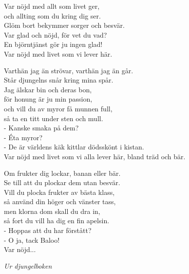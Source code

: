 \vspace{10pt}
Var nöjd med allt som livet ger,\\
och allting som du kring dig ser.\\
Glöm bort bekymmer sorger och besvär.\\
Var glad och nöjd, för vet du vad?\\
En björntjänst gör ju ingen glad!\\
Var nöjd med livet som vi lever här.\par
\vspace{10pt}
Varthän jag än strövar, varthän jag än går.\\
Står djungelns snår kring mina spår.\\
Jag älskar bin och deras bon,\\
för honung är ju min passion,\\
och vill du av myror få munnen full,\\
så ta en titt under sten och mull.\\
- Kanske smaka på dem?\\
- Éta myror?\\
- De är världens käk kittlar dödsskönt i kistan.\\
Var nöjd med livet som vi alla lever här, bland träd och bär.\par
\vspace{10pt}
Om frukter dig lockar, banan eller bär.\\
Se till att du plockar dem utan besvär.\\
Vill du plocka frukter av bästa klass,\\
så använd din höger och vänster tass,\\
men klorna dom skall du dra in,\\
så fort du vill ha dig en fin apelsin.\\
- Hoppas att du har förstått?\\
- O ja, tack Baloo!\\
Var nöjd...
\par
\vspace{10pt}
{\footnotesize\textit{Ur djungelboken}}

